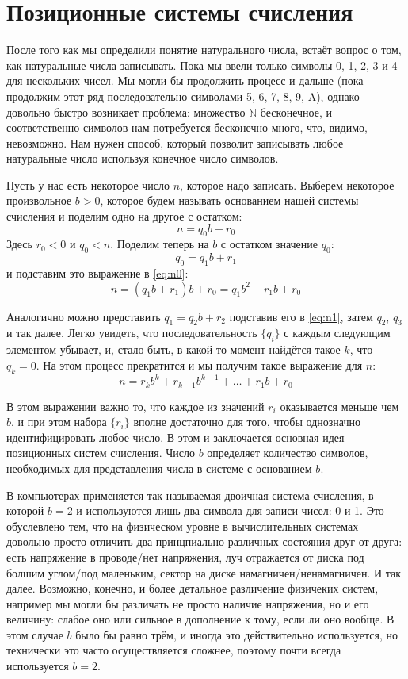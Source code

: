 \section{Позиционные системы счисления}

После того как мы определили понятие натурального числа, встаёт вопрос о том, как натуральные числа записывать. Пока мы ввели только символы 0, 1, 2, 3 и 4 для нескольких чисел. Мы могли бы продолжить процесс и дальше (пока продолжим этот ряд последовательно символами 5, 6, 7, 8, 9, A), однако довольно быстро возникает проблема: множество $\mathbb{N}$ бесконечное, и соответственно символов нам потребуется бесконечно много, что, видимо, невозможно. Нам нужен способ, который позволит записывать любое натуральные число используя конечное число символов.

Пусть у нас есть некоторое число $n$, которое надо записать. Выберем некоторое произвольное $b > 0$, которое будем называть основанием нашей системы счисления и поделим одно на другое с остатком:
\begin{equation}\label{eq:n0}
n = q_0b + r_0
\end{equation}
Здесь $r_0 < 0$ и $q_0 < n$. Поделим теперь на $b$ с остатком значение $q_0$: $$q_0 = q_1b + r_1$$ и подставим это выражение в \eqref{eq:n0}:
\begin{equation}\label{eq:n1}
n = (q_1b + r_1)b + r_0 = q_1b^2 + r_1b + r_0
\end{equation}

Аналогично можно представить $q_1 = q_2b + r_2$ подставив его в \eqref{eq:n1}, затем $q_2$, $q_3$ и так далее. Легко увидеть, что последовательность $\{q_i\}$ с каждым следующим элементом убывает, и, стало быть, в какой-то момент найдётся такое $k$, что $q_k = 0$. На этом процесс прекратится и мы получим такое выражение для $n$:
\begin{equation}\label{eq:nk}
n = r_kb^k + r_{k-1}b^{k-1} +\ldots + r_1b + r_0
\end{equation}

В этом выражении важно то, что каждое из значений $r_i$ оказывается меньше чем $b$, и при этом набора $\{r_i\}$ вполне достаточно для того, чтобы однозначно идентифицировать любое число. В этом и заключается основная идея позиционных систем счисления. Число $b$ определяет количество символов, необходимых для представления числа в системе с основанием $b$.

В компьютерах применяется так называемая двоичная система счисления, в которой $b=2$ и используются лишь два символа для записи чисел: 0 и 1. Это обуслевлено тем, что на физическом уровне в вычислительных системах довольно просто отличить два принцпиально различных состояния друг от друга: есть напряжение в проводе/нет напряжения, луч отражается от диска под болшим углом/под маленьким, сектор на диске намагничен/ненамагничен. И так далее. Возможно, конечно, и более детальное различение физичеких систем, например мы могли бы различать не просто наличие напряжения, но и его величину: слабое оно или сильное в дополнение к тому, если ли оно вообще. В этом случае $b$ было бы равно трём, и иногда это действительно используется, но технически это часто осуществляется сложнее, поэтому почти всегда используется $b=2$.


